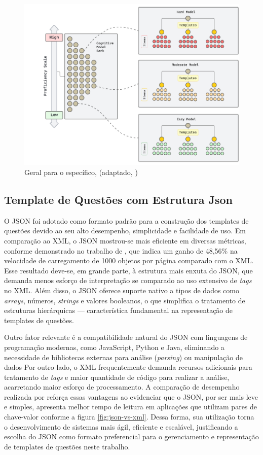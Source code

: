\begin{figure}[ht]
	\centering
	\includegraphics[width=14cm]{./imagens/capitulo5/proficiency-scale-named}
	\caption{Geral para o específico, (adaptado, \cite{hendrickson2010}) }
	\label{fig:proficiency-scale}
\end{figure}

\subsection{Template de Questões com Estrutura Json}

O JSON foi adotado como formato padrão para a construção dos templates de questões devido ao seu alto desempenho, simplicidade e facilidade de uso. Em comparação ao XML, o JSON mostrou-se mais eficiente em diversas métricas, conforme demonstrado no trabalho de \parencite{wang2011}, que indica um ganho de  48,56\% na velocidade de carregamento de 1000 objetos por página comparado com o XML. Esse resultado deve-se, em grande parte, à estrutura mais enxuta do JSON, que demanda menos esforço de interpretação se comparado ao uso extensivo de \textit{tags} no XML.  Além disso, o JSON oferece suporte nativo a tipos de dados como \textit{arrays}, números, \textit{strings} e valores booleanos, o que simplifica o tratamento de estruturas hierárquicas — característica fundamental na representação de templates de questões.


 Outro fator relevante é a compatibilidade natural do JSON com linguagens de programação modernas, como JavaScript, Python e Java, eliminando a necessidade de bibliotecas externas para análise (\textit{parsing}) ou manipulação de dados Por outro lado, o XML frequentemente demanda recursos adicionais para tratamento de \textit{tags} e maior quantidade de código para realizar a análise, acarretando maior esforço de processamento.   A comparação de desempenho realizada por \parencite{goyal2017} reforça essas vantagens ao evidenciar que o JSON, por ser mais leve e simples, apresenta melhor tempo de leitura em aplicações que utilizam pares de chave-valor conforme a figura \ref{fig:json-vs-xml}. Dessa forma, sua utilização torna o desenvolvimento de sistemas mais ágil, eficiente e escalável, justificando a escolha do JSON como formato preferencial para o gerenciamento e representação de templates de questões neste trabalho. 

